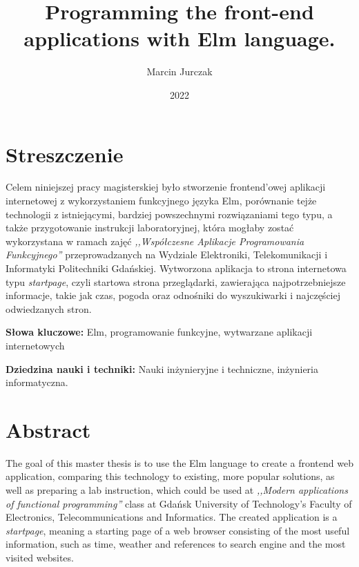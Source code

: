 \documentclass[twoside,a4paper]{report}
\begin{document}


\title{Programming the front-end applications with Elm language.}
\author{Marcin Jurczak}
\date{2022}

\maketitle
\clearpage
{}


\chapter*{Streszczenie}
\noindent
Celem niniejszej pracy magisterskiej było stworzenie frontend'owej aplikacji internetowej z wykorzystaniem funkcyjnego języka Elm, porównanie tejże technologii z istniejącymi, bardziej powszechnymi rozwiązaniami tego typu, a także przygotowanie instrukcji laboratoryjnej, która mogłaby zostać wykorzystana w ramach zajęć \textit{,,Współczesne Aplikacje Programowania Funkcyjnego''} przeprowadzanych na Wydziale Elektroniki, Telekomunikacji i Informatyki Politechniki Gdańskiej.
Wytworzona aplikacja to strona internetowa typu \textit{startpage}, czyli startowa strona przeglądarki, zawierająca najpotrzebniejsze informacje, takie jak czas, pogoda oraz odnośniki do wyszukiwarki i najczęściej odwiedzanych stron.

\textbf{Słowa kluczowe:} Elm, programowanie funkcyjne, wytwarzane aplikacji internetowych

\textbf{Dziedzina nauki i techniki: }Nauki inżynieryjne i techniczne, inżynieria informatyczna.

\vspace{80pt}
{\let\clearpage\relax\chapter*{Abstract}}
\noindent
The goal of this master thesis is to use the Elm language to create a frontend web application, comparing this technology to existing, more popular solutions, as well as preparing a lab instruction, which could be used at \textit{,,Modern applications of functional programming''} class at Gdańsk University of Technology’s Faculty of Electronics, Telecommunications and Informatics.
The created application is a \textit{startpage}, meaning a starting page of a web browser consisting of the most useful information, such as time, weather and references to search engine and the most visited websites.
\end{document}
